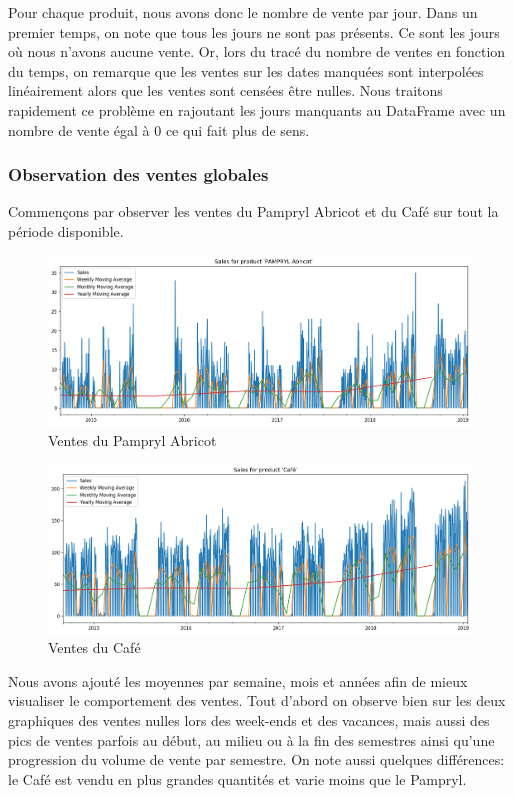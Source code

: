 Pour chaque produit, nous avons donc le nombre de vente par jour. Dans un premier temps, on note que tous les jours ne sont pas présents. Ce sont les jours où nous n'avons aucune vente. Or, lors du tracé du nombre de ventes en fonction du temps, on remarque que les ventes sur les dates manquées sont interpolées linéairement alors que les ventes sont censées être nulles. Nous traitons rapidement ce problème en rajoutant les jours manquants au DataFrame avec un nombre de vente égal à $0$ ce qui fait plus de sens.

\subsubsection{Observation des ventes globales}

Commençons par observer les ventes du Pampryl Abricot et du Café sur tout la période disponible.
\begin{figure}[H]
	\centering
	\includegraphics[width=\textwidth]{figures/all_sales_pampryl_abricot.png}
	\caption{Ventes du Pampryl Abricot}
    \label{fig:all_sales_pampryl_abricot}
\end{figure}

\begin{figure}[H]
	\centering
	\includegraphics[width=\textwidth]{figures/all_sales_cafe.png}
	\caption{Ventes du Café}
    \label{fig:all_sales_cafe}
\end{figure}

Nous avons ajouté les moyennes par semaine, mois et années afin de mieux visualiser le comportement des ventes. Tout d'abord on observe bien sur les deux graphiques des ventes nulles lors des week-ends et des vacances, mais aussi des pics de ventes parfois au début, au milieu ou à la fin des semestres ainsi qu'une progression du volume de vente par semestre. On note aussi quelques différences: le Café est vendu en plus grandes quantités et varie moins que le Pampryl.

